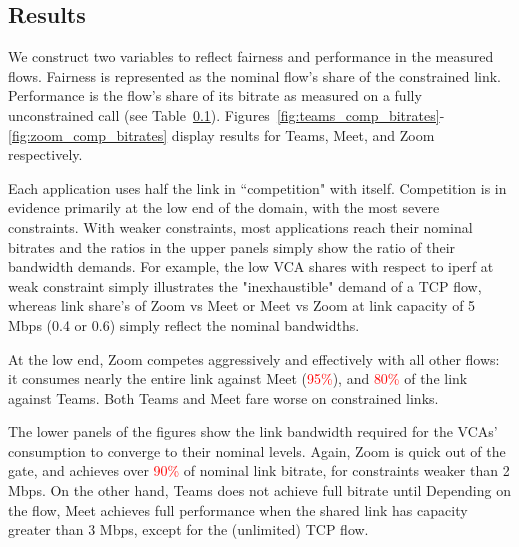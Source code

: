 \subsection{Results}

We construct two variables
  to reflect fairness and performance in the measured flows.
Fairness is represented 
  as the nominal flow's share of the constrained link.
Performance is the flow's share of its bitrate 
 as measured on a fully unconstrained call (see Table~\ref{}).
Figures~\ref{fig:teams_comp_bitrates}-\ref{fig:zoom_comp_bitrates}
  display results for Teams, Meet, and Zoom respectively.

Each application uses half the link in ``competition" with itself.
Competition is in evidence primarily at the low end of the domain,
  with the most severe constraints.
With weaker constraints, most applications reach their nominal bitrates
  and the ratios in the upper panels simply show the ratio of their bandwidth demands.
For example, 
  the low VCA shares with respect to iperf at weak constraint
  simply illustrates the "inexhaustible" demand of a TCP flow,
  whereas link share's of Zoom vs Meet or Meet vs Zoom 
  at link capacity of 5 Mbps (0.4 or 0.6) simply 
  reflect the nominal bandwidths.

  
At the low end, Zoom competes
  aggressively and effectively with all other flows:
  it consumes nearly the entire link against Meet (\textcolor{red}{95\%}), 
  and \textcolor{red}{80\%} of the link against Teams.
Both Teams and Meet fare worse on constrained links.
  
The lower panels of the figures show
  the link bandwidth required for the VCAs' consumption
  to converge to their nominal levels.
Again, Zoom is quick out of the gate, and 
  achieves over \textcolor{red}{90\%} of nominal link bitrate,
  for constraints weaker than 2 Mbps.
On the other hand, Teams does not achieve full bitrate
  until 
Depending on the flow, Meet achieves full 
  performance when the shared link has capacity greater than 3 Mbps, 
  except for the (unlimited) TCP flow.
  

